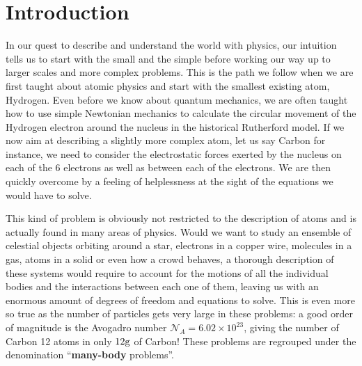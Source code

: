 \chapter*{Introduction}

\label{chap:intro}





In our quest to describe and understand the world with physics, our intuition tells us to start with the small and the simple before working our way up to larger scales and more complex problems. This is the path we follow when we are first taught about atomic physics and start with the smallest existing atom, Hydrogen. Even before we know about quantum mechanics, we are often taught how to use simple Newtonian mechanics to calculate the circular movement of the Hydrogen electron around the nucleus in the historical Rutherford model. If we now aim at describing a slightly more complex atom, let us say Carbon for instance, we need to consider the electrostatic forces exerted by the nucleus on each of the 6 electrons as well as between each of the electrons. We are then quickly overcome by a feeling of helplessness at the sight of the equations we would have to solve.


This kind of problem is obviously not restricted to the description of atoms and is actually found in many areas of physics. Would we want to study an ensemble of celestial objects orbiting around a star, electrons in a copper wire, molecules in a gas, atoms in a solid or even how a crowd behaves, a thorough description of these systems would require to account for the motions of all the individual bodies and the interactions between each one of them, leaving us with an enormous amount of degrees of freedom and equations to solve. This is even more so true as the number of particles gets very large in these problems: a good order of magnitude is the Avogadro number $\mathcal{N}_A = 6.02 \times 10^{23}$, giving the number of Carbon 12 atoms in only $12\rm{g}$ of Carbon! These problems are regrouped under the denomination ``\textbf{many-body} problems''. 


